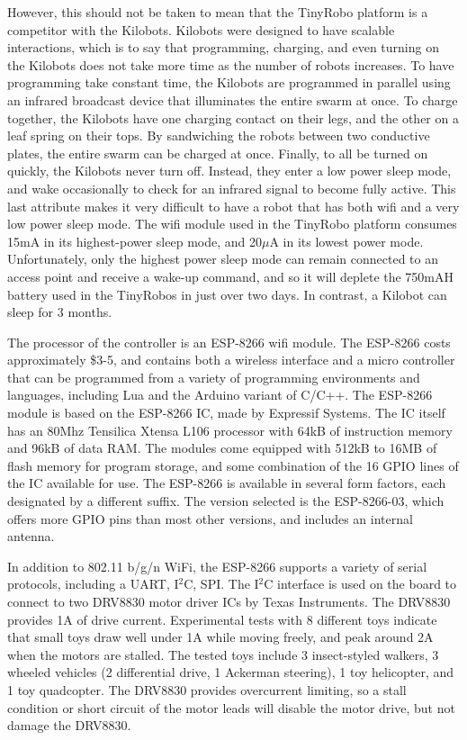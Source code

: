 However, this should not be taken to mean that the TinyRobo platform is a competitor with the Kilobots. 
Kilobots were designed to have scalable interactions, which is to say that programming, charging, and even turning on the Kilobots does not take more time as the number of robots increases. 
To have programming take constant time, the Kilobots are programmed in parallel using an infrared broadcast device that illuminates the entire swarm at once. 
To charge together, the Kilobots have one charging contact on their legs, and the other on a leaf spring on their tops. 
By sandwiching the robots between two conductive plates, the entire swarm can be charged at once.
Finally, to all be turned on quickly, the Kilobots never turn off.  
Instead, they enter a low power sleep mode, and wake occasionally to check for an infrared signal to become fully active. 
This last attribute makes it very difficult to have a robot that has both wifi and a very low power sleep mode. 
The wifi module used in the TinyRobo platform consumes 15mA in its highest-power sleep mode, and 20$\mu$A in its lowest power mode. 
Unfortunately, only the highest power sleep mode can remain connected to an access point and receive a wake-up command, and so it will deplete the 750mAH battery used in the TinyRobos in just over two days. 
In contrast, a Kilobot can sleep for 3 months. 

The processor of the controller is an ESP-8266 wifi module.
The ESP-8266 costs approximately \$3-5, and contains both a wireless interface and a micro controller that can be programmed from a variety of programming environments and languages, including Lua and the Arduino variant of C/C++. The ESP-8266 module is based on the ESP-8266 IC, made by Expressif Systems. The IC itself has an 80Mhz Tensilica Xtensa L106 processor with 64kB of instruction memory and 96kB of data RAM. The modules come equipped with 512kB to 16MB of flash memory for program storage, and some combination of the 16 GPIO lines of the IC available for use. 
The ESP-8266 is available in several form factors, each designated by a different suffix. 
The version selected is the ESP-8266-03, which offers more GPIO pins than most other versions, and includes an internal antenna.

In addition to 802.11 b/g/n WiFi, the ESP-8266 supports a variety of serial protocols, including a UART, I$^2$C, SPI. 
The I$^2$C interface is used on the board to connect to two DRV8830 motor driver ICs by Texas Instruments. 
The DRV8830 provides 1A of drive current.
Experimental tests with 8 different toys indicate that small toys draw well under 1A while moving freely, and peak around 2A when the motors are stalled. 
The tested toys include 3 insect-styled walkers, 3 wheeled vehicles (2 differential drive, 1 Ackerman steering), 1 toy helicopter, and 1 toy quadcopter.
The DRV8830 provides overcurrent limiting, so a stall condition or short circuit of the motor leads will disable the motor drive, but not damage the DRV8830. 


